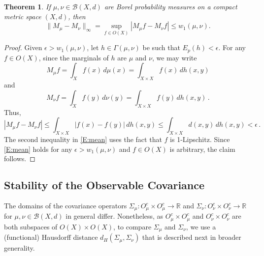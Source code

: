 \documentclass[11pt]{article}
\newtheorem{theorem}{Theorem}[section]
\theoremstyle{definition}
\newcommand{\real}{\ensuremath{\mathbb{R}}}
\newcommand{\obs}[1]{\ensuremath{O(#1)}}
\newcommand{\cobs}[1]{\ensuremath{O^c_{#1}}}
\newcommand{\borel}{\ensuremath{\mathcal{B}}}
\begin{document}
\begin{theorem} \label{T:stabmean}
If $\mu, \nu \in \borel (X,d)$ are Borel probability measures on a compact metric space $(X,d)$, then
\[
\|M_\mu - M_\nu\|_\infty = \sup_{f\in \obs{X}} |M_\mu f - M_\nu f| \leq w_1 (\mu,\nu).
\]
\end{theorem}

\begin{proof}
 Given $\epsilon > w_1 (\mu,\nu)$, let $h \in \Gamma(\mu,\nu)$ be such that $E_p(h) < \epsilon$. For any $f \in \obs{X}$, since the marginals of $h$ are $\mu$ and $\nu$, we may write
\begin{equation} 
M_\mu f = \int_X f(x) \, d\mu (x) = \int _{X \times X} f(x) \,dh (x,y)
\end{equation}
and
\begin{equation} 
M_\nu f = \int_X f(y) \, d\nu (y) = \int _{X \times X} f(y) \,dh (x,y) \,.
\end{equation}
Thus, 
\begin{equation} \label{E:mean}
|M_\mu f - M_\nu f| \leq \int_{X \times X} |f(x)-f(y)|\, dh(x,y) \leq \int_{X \times X} d(x,y) \, dh(x,y) < \epsilon \,.
\end{equation}
The second inequality in \eqref{E:mean} uses the fact that $f$ is 1-Lipschitz. Since \eqref{E:mean} holds for any $\epsilon > w_1 (\mu,\nu)$ and $f \in \obs{X}$ is arbitrary, the claim follows.
\end{proof}


\subsection{Stability of the Observable Covariance} 

The domains of the covariance operators $\Sigma_\mu \colon \cobs{\mu} \times \cobs{\mu} \to \real$ and $\Sigma_\nu \colon \cobs{\nu} \times \cobs{\nu} \to \real$ for $\mu, \nu \in \borel (X,d)$  in general differ. Nonetheless, as $\cobs{\mu} \times \cobs{\mu}$ and $\cobs{\nu} \times \cobs{\nu}$ are both subspaces of $\obs{X} \times \obs{X}$, to compare $\Sigma_\mu$ and $\Sigma_\nu$, we use a (functional) Hausdorff distance $d_H (\Sigma_\mu, \Sigma_\nu)$ that is described next in broader generality.
\end{document}
